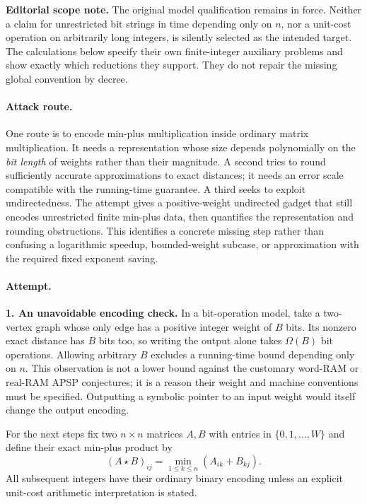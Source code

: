 \documentclass[11pt,a4paper]{article}
\numberwithin{equation}{section}
\begin{document}
\textbf{Editorial scope note.} The original model qualification remains
in force. Neither a claim for unrestricted bit strings in time depending
only on $n$, nor a unit-cost operation on arbitrarily long integers, is
silently selected as the intended target. The calculations below specify
their own finite-integer auxiliary problems and show exactly which
reductions they support. They do not repair the missing global convention
by decree.

\paragraph{Attack route.}
One route is to encode min-plus multiplication inside ordinary matrix
multiplication. It needs a representation whose size depends polynomially
on the \emph{bit length} of weights rather than their magnitude. A second
tries to round sufficiently accurate approximations to exact distances;
it needs an error scale compatible with the running-time guarantee. A
third seeks to exploit undirectedness. The attempt gives a positive-weight
undirected gadget that still encodes unrestricted finite min-plus data,
then quantifies the representation and rounding obstructions. This
identifies a concrete missing step rather than confusing a logarithmic
speedup, bounded-weight subcase, or approximation with the required fixed
exponent saving.

\paragraph{Attempt.}
\textbf{1. An unavoidable encoding check.}
In a bit-operation model, take a two-vertex graph whose only edge has a
positive integer weight of $B$ bits. Its nonzero exact distance has $B$
bits too, so writing the output alone takes $\Omega(B)$ bit operations.
Allowing arbitrary $B$ excludes a running-time bound depending only on
$n$. This observation is not a lower bound against the customary
word-RAM or real-RAM APSP conjectures; it is a reason their weight and
machine conventions must be specified. Outputting a symbolic pointer to
an input weight would itself change the output encoding.

For the next steps fix two $n\times n$ matrices $A,B$ with entries in
$\{0,1,\ldots,W\}$ and define their exact min-plus product by
\[
 (A\star B)_{ij}=\min_{1\leq k\leq n}(A_{ik}+B_{kj}).
\]
All subsequent integers have their ordinary binary encoding unless an
explicit unit-cost arithmetic interpretation is stated.
\end{document}
